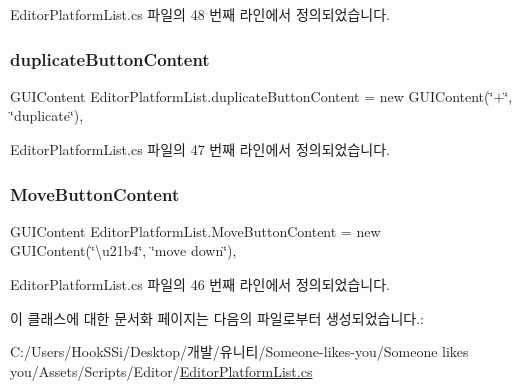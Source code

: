 Editor\+Platform\+List.\+cs 파일의 48 번째 라인에서 정의되었습니다.

\mbox{\label{class_editor_platform_list_a6e8a9ff76288daab5d7e50864508c8ba}} 
\subsubsection{\texorpdfstring{duplicateButtonContent}{duplicateButtonContent}}
{\footnotesize\ttfamily G\+U\+I\+Content Editor\+Platform\+List.\+duplicate\+Button\+Content = new G\+U\+I\+Content(\char`\"{}+\char`\"{}, \char`\"{}duplicate\char`\"{})\hspace{0.3cm}{\ttfamily [static]}, {\ttfamily [private]}}



Editor\+Platform\+List.\+cs 파일의 47 번째 라인에서 정의되었습니다.

\mbox{\label{class_editor_platform_list_a49d984355385da84a591d38aae7514db}} 
\subsubsection{\texorpdfstring{MoveButtonContent}{MoveButtonContent}}
{\footnotesize\ttfamily G\+U\+I\+Content Editor\+Platform\+List.\+Move\+Button\+Content = new G\+U\+I\+Content(\char`\"{}\textbackslash{}u21b4\char`\"{}, \char`\"{}move down\char`\"{})\hspace{0.3cm}{\ttfamily [static]}, {\ttfamily [private]}}



Editor\+Platform\+List.\+cs 파일의 46 번째 라인에서 정의되었습니다.



이 클래스에 대한 문서화 페이지는 다음의 파일로부터 생성되었습니다.\+:\begin{DoxyCompactItemize}
\item 
C\+:/\+Users/\+Hook\+S\+Si/\+Desktop/개발/유니티/\+Someone-\/likes-\/you/\+Someone likes you/\+Assets/\+Scripts/\+Editor/\mbox{\hyperlink{_editor_platform_list_8cs}{Editor\+Platform\+List.\+cs}}\end{DoxyCompactItemize}
